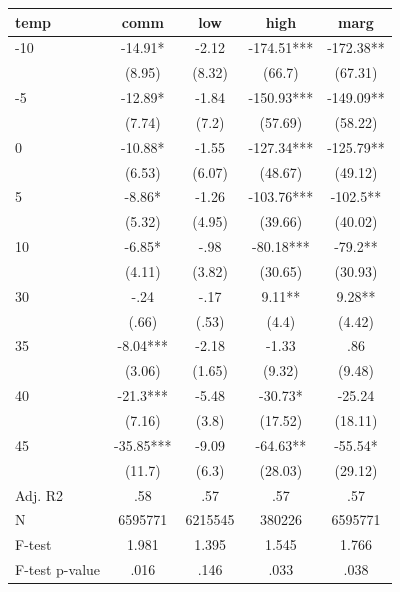\documentclass[]{article}
\begin{document}
\begin{tabular}{lcccc} \hline
temp & comm & low & high & marg \\ \hline
-10 & -14.91* & -2.12 & -174.51*** & -172.38** \\
 & (8.95) & (8.32) & (66.7) & (67.31) \\
-5 & -12.89* & -1.84 & -150.93*** & -149.09** \\
 & (7.74) & (7.2) & (57.69) & (58.22) \\
0 & -10.88* & -1.55 & -127.34*** & -125.79** \\
 & (6.53) & (6.07) & (48.67) & (49.12) \\
5 & -8.86* & -1.26 & -103.76*** & -102.5** \\
 & (5.32) & (4.95) & (39.66) & (40.02) \\
10 & -6.85* & -.98 & -80.18*** & -79.2** \\
 & (4.11) & (3.82) & (30.65) & (30.93) \\
30 & -.24 & -.17 & 9.11** & 9.28** \\
 & (.66) & (.53) & (4.4) & (4.42) \\
35 & -8.04*** & -2.18 & -1.33 & .86 \\
 & (3.06) & (1.65) & (9.32) & (9.48) \\
40 & -21.3*** & -5.48 & -30.73* & -25.24 \\
 & (7.16) & (3.8) & (17.52) & (18.11) \\
45 & -35.85*** & -9.09 & -64.63** & -55.54* \\
 & (11.7) & (6.3) & (28.03) & (29.12) \\
\hline Adj. R2 & .58 & .57 & .57 & .57 \\
N & 6595771 & 6215545 & 380226 & 6595771 \\
F-test & 1.981 & 1.395 & 1.545 & 1.766 \\
 F-test p-value & .016 & .146 & .033 & .038 \\ \hline
\end{tabular}
\end{document}
